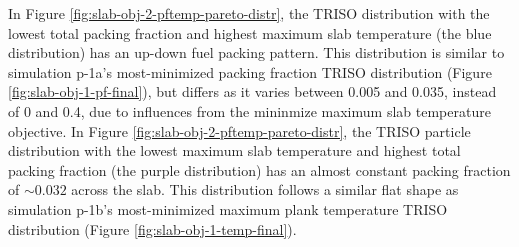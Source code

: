 In Figure \ref{fig:slab-obj-2-pftemp-pareto-distr}, the TRISO distribution with the lowest 
total packing fraction and highest maximum slab temperature (the blue distribution) has 
an up-down fuel packing pattern. 
This distribution is similar to simulation p-1a's most-minimized packing fraction TRISO 
distribution (Figure \ref{fig:slab-obj-1-pf-final}), but differs as it varies between 
0.005 and 0.035, instead of 0 and 0.4, due to influences from the mininmize maximum slab 
temperature objective. 
In Figure \ref{fig:slab-obj-2-pftemp-pareto-distr}, the TRISO particle distribution with the 
lowest maximum slab temperature and highest total packing fraction (the purple distribution)
has an almost constant packing fraction of $\sim0.032$ across the slab. 
This distribution follows a similar flat shape as simulation p-1b's most-minimized maximum 
plank temperature TRISO distribution (Figure \ref{fig:slab-obj-1-temp-final}).

